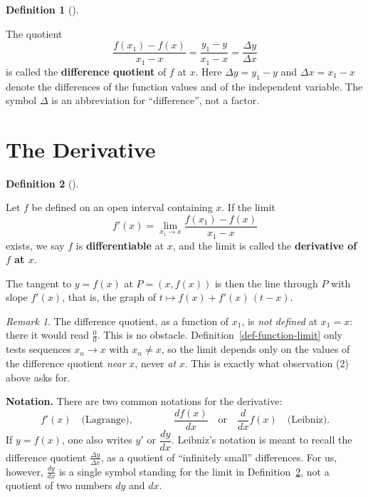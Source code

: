 \documentclass[
  letterpaper,
  DIV=11,
  numbers=noendperiod]{scrreprt}
\theoremstyle{plain}
\theoremstyle{plain}
\theoremstyle{definition}
\newtheorem{definition}{Definition}[chapter]
\theoremstyle{definition}
\theoremstyle{definition}
\theoremstyle{plain}
\theoremstyle{plain}
\theoremstyle{remark}
\newtheorem{refremark}{Remark}[chapter]
\begin{document}
\begin{definition}[]\protect\hypertarget{def-difference-quotient}{}\label{def-difference-quotient}

\hfill\break
The quotient \[
\frac{f(x_1)-f(x)}{x_1-x} = \frac{y_1-y}{x_1-x} = \frac{\Delta y}{\Delta x}
\] is called the \textbf{difference quotient} of \(f\) at \(x\). Here
\(\Delta y = y_1-y\) and \(\Delta x = x_1-x\) denote the differences of
the function values and of the independent variable. The symbol
\(\Delta\) is an abbreviation for ``difference'', not a factor.

\end{definition}

\section{The Derivative}\label{the-derivative-2}

\begin{definition}[]\protect\hypertarget{def-derivative}{}\label{def-derivative}

\hfill\break
Let \(f\) be defined on an open interval containing \(x\). If the limit
\[
f'(x) = \lim_{x_1\to x}\frac{f(x_1)-f(x)}{x_1-x}
\] exists, we say \(f\) is \textbf{differentiable} at \(x\), and the
limit is called the \textbf{derivative of \(f\) at \(x\)}.

\end{definition}

The tangent to \(y=f(x)\) at \(P=(x,f(x))\) is then the line through
\(P\) with slope \(f'(x)\), that is, the graph of
\(t\mapsto f(x)+f'(x)\,(t-x)\).

\begin{refremark}
The difference quotient, as a function of \(x_1\), is \emph{not defined}
at \(x_1=x\): there it would read \(\frac00\). This is no obstacle.
Definition~\ref{def-function-limit} only tests sequences \(x_n\to x\)
with \(x_n\neq x\), so the limit depends only on the values of the
difference quotient \emph{near} \(x\), never \emph{at} \(x\). This is
exactly what observation (2) above asks for.

\label{rem-derivative-limit-definition}

\end{refremark}

\textbf{Notation.} There are two common notations for the derivative: \[
f'(x) \quad \text{(Lagrange)}, \qquad\qquad \frac{df(x)}{dx} \quad\text{or}\quad \frac{d}{dx}f(x)
\quad \text{(Leibniz)}.
\] If \(y=f(x)\), one also writes \(y'\) or \(\dfrac{dy}{dx}\).
Leibniz's notation is meant to recall the difference quotient
\(\frac{\Delta y}{\Delta x}\), as a quotient of ``infinitely small''
differences. For us, however, \(\frac{dy}{dx}\) is a single symbol
standing for the limit in Definition~\ref{def-derivative}, not a
quotient of two numbers \(dy\) and \(dx\).
\end{document}
